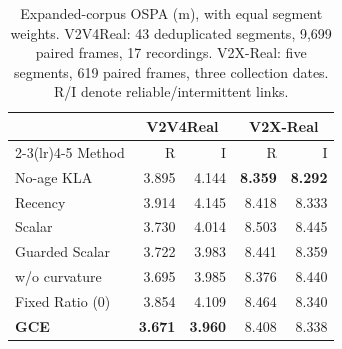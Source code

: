 \begin{table}[t]
\centering\small
\caption{Expanded-corpus OSPA (m), with equal segment weights. V2V4Real: 43 deduplicated segments, 9,699 paired frames, 17 recordings. V2X-Real: five segments, 619 paired frames, three collection dates. R/I denote reliable/intermittent links.}
\label{tab:followup}
\setlength{\tabcolsep}{3pt}
\begin{tabular*}{\columnwidth}{@{\extracolsep{\fill}}lrrrr@{}}
\toprule
& \multicolumn{2}{c}{V2V4Real} & \multicolumn{2}{c}{V2X-Real} \\
\cmidrule(lr){2-3}\cmidrule(lr){4-5}
Method & R & I & R & I \\
\midrule
No-age KLA & 3.895 & 4.144 & \textbf{8.359} & \textbf{8.292} \\
Recency & 3.914 & 4.145 & 8.418 & 8.333 \\
Scalar & 3.730 & 4.014 & 8.503 & 8.445 \\
Guarded Scalar & 3.722 & 3.983 & 8.441 & 8.359 \\
w/o curvature & 3.695 & 3.985 & 8.376 & 8.440 \\
Fixed Ratio (0) & 3.854 & 4.109 & 8.464 & 8.340 \\
\midrule
\textbf{GCE} & \textbf{3.671} & \textbf{3.960} & 8.408 & 8.338 \\
\bottomrule
\end{tabular*}
\end{table}
